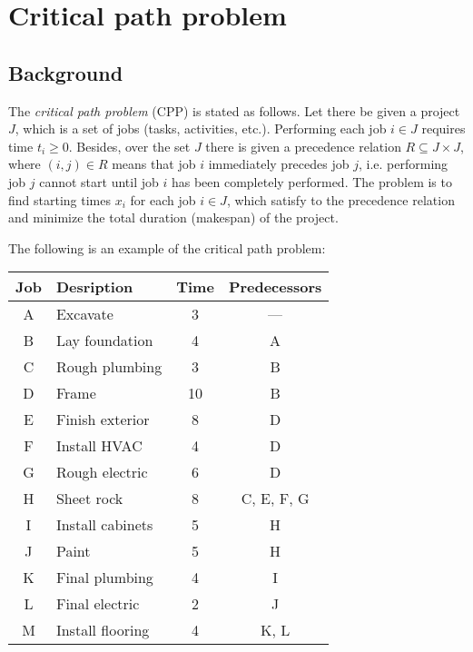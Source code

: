 \documentclass[11pt]{report}
\begin{document}

\newpage

\section{Critical path problem}

\subsection{Background}

The {\it critical path problem} (CPP) is stated as follows. Let there
be given a project $J$, which is a set of jobs (tasks, activities,
etc.). Performing each job $i\in J$ requires time $t_i\geq 0$. Besides,
over the set $J$ there is given a precedence relation
$R\subseteq J\times J$, where $(i,j)\in R$ means that job $i$
immediately precedes job $j$, i.e. performing job $j$ cannot start
until job $i$ has been completely performed. The problem is to find
starting times $x_i$ for each job $i\in J$, which satisfy to the
precedence relation and minimize the total duration (makespan) of the
project.

The following is an example of the critical path problem:

\bigskip

\begin{center}
\begin{tabular}{|c|l|c|c|}
\hline
Job&Desription&Time&Predecessors\\
\hline
A&Excavate&3&---\\
B&Lay foundation&4&A\\
C&Rough plumbing&3&B\\
D&Frame&10&B\\
E&Finish exterior&8&D\\
F&Install HVAC&4&D\\
G&Rough electric&6&D\\
H&Sheet rock&8&C, E, F, G\\
I&Install cabinets&5&H\\
J&Paint&5&H\\
K&Final plumbing&4&I\\
L&Final electric&2&J\\
M&Install flooring&4&K, L\\
\hline
\end{tabular}
\end{center}

\bigskip
\end{document}
